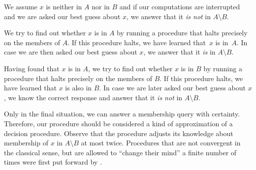 \begin{codelisting}
\item
  We assume $x$ is neither in $A$ nor in $B$ and if our computations are interrupted and we are asked our best guess about $x$, we answer that it \emph{is not} in $A \setminus B$.
\item
  We try to find out whether $x$ is in $A$ by running a procedure that halts precisely on the members of $A$.
  If this procedure halts, we have learned that~$x$ is in~$A$.
  In case we are then asked our best guess about $x$, we answer that it \emph{is} in $A \setminus B$.
\item
  Having found that $x$ is in $A$, we try to find out whether $x$ is in $B$ by running a procedure that halts precisely on the members of $B$.
  If this procedure halts, we have learned that $x$ is also in $B$.
  In case we are later asked our best guess about $x$, we know the correct response and answer that it \emph{is not} in $A \setminus B$.
\end{codelisting}
Only in the final situation, we can answer a membership query with certainty.
Therefore, our procedure should be considered a kind of approximation of a decision procedure.
Observe that the procedure adjusts its knowledge about membership of $x$ in $A \setminus B$ at most twice.
Procedures that are not convergent in the classical sense, but are allowed to \enquote{change their mind} a finite number of times were first put forward by \textcite{putnam1965trial,gold1965limiting}.

